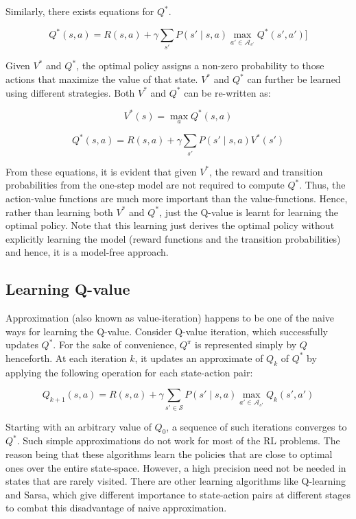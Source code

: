 Similarly, there exists equations for \(Q^*\).

\begin{equation}
    Q^* (s,a)=R(s,a)+\gamma \sum_{s'} P(s'\mid s,a)   \max_{a' \in \mathcal{A}_{s'}}  ⁡Q^* (s',a')]    
\end{equation}


Given \(V^*\) and \(Q^*\), the optimal policy assigns a non-zero probability to those actions that maximize the value of that state. \(V^*\) and \(Q^*\) can further be learned using different strategies. Both \(V^*\) and \(Q^*\) can be re-written as:

\begin{equation}
    V^* (s)=\max_a ⁡Q^* (s,a)
\end{equation}

\begin{equation}
    Q^* (s,a)=R(s,a)+ \gamma \sum_{s'} P(s'\mid s,a)  V^* (s' ) 
\end{equation}


From these equations, it is evident that given \(V^*\), the reward and transition probabilities from the one-step model are not required to compute \(Q^*\). Thus, the action-value functions are much more important than the value-functions. Hence, rather than learning both \(V^*\) and \(Q^*\), just the Q-value is learnt for learning the optimal policy. Note that this learning just derives the optimal policy without explicitly learning the model (reward functions and the transition probabilities) and hence, it is a model-free approach. 


\subsection{Learning Q-value}

Approximation (also known as value-iteration) happens to be one of the naive ways for learning the Q-value. Consider Q-value iteration, which successfully updates \(Q^*\). For the sake of convenience, \(Q^\pi\) is represented simply by \(Q\) henceforth. At each iteration \(k\), it updates an approximate of \(Q_k\) of \(Q^*\) by applying the following operation for each state-action pair:

\begin{equation}
    Q_{k+1} (s,a)=R(s,a)+ \gamma \sum_{s' \in \mathcal{S}} P(s'\mid s,a)   \max_{a' \in \mathcal{A}_{s'}} ⁡Q_k (s',a')
\end{equation}

Starting with an arbitrary value of \(Q_0\), a sequence of such iterations converges to \(Q^*\). Such simple approximations do not work for most of the RL problems. The reason being that these algorithms learn the policies that are close to optimal ones over the entire state-space. However, a high precision need not be needed in states that are rarely visited. There are other learning algorithms like Q-learning and Sarsa, which give different importance to state-action pairs at different stages to combat this disadvantage of naive approximation. 


